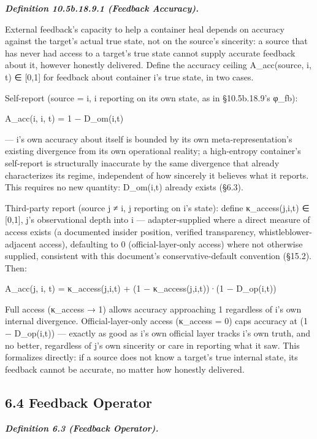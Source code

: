 \documentclass[
]{article}
\begin{document}
\emph{\textbf{Definition 10.5b.18.9.1 (Feedback Accuracy).}}

External feedback's capacity to help a container heal depends on
accuracy against the target's actual true state, not on the source's
sincerity: a source that has never had access to a target's true state
cannot supply accurate feedback about it, however honestly delivered.
Define the accuracy ceiling A\_acc(source, i, t) ∈ {[}0,1{]} for
feedback about container i's true state, in two cases.

Self-report (source = i, i reporting on its own state, as in
§10.5b.18.9's φ\_fb):

A\_acc(i, i, t) = 1 − D\_om(i,t)

--- i's own accuracy about itself is bounded by its own
meta-representation's existing divergence from its own operational
reality; a high-entropy container's self-report is structurally
inaccurate by the same divergence that already characterizes its regime,
independent of how sincerely it believes what it reports. This requires
no new quantity: D\_om(i,t) already exists (§6.3).

Third-party report (source j ≠ i, j reporting on i's state): define
κ\_access(j,i,t) ∈ {[}0,1{]}, j's observational depth into i ---
adapter-supplied where a direct measure of access exists (a documented
insider position, verified transparency, whistleblower-adjacent access),
defaulting to 0 (official-layer-only access) where not otherwise
supplied, consistent with this document's conservative-default
convention (§15.2). Then:

A\_acc(j, i, t) = κ\_access(j,i,t) + (1 − κ\_access(j,i,t))·(1 −
D\_op(i,t))

Full access (κ\_access → 1) allows accuracy approaching 1 regardless of
i's own internal divergence. Official-layer-only access (κ\_access = 0)
caps accuracy at (1 − D\_op(i,t)) --- exactly as good as i's own
official layer tracks i's own truth, and no better, regardless of j's
own sincerity or care in reporting what it saw. This formalizes
directly: if a source does not know a target's true internal state, its
feedback cannot be accurate, no matter how honestly delivered.

\hypertarget{feedback-operator}{%
\subsection{6.4 Feedback Operator}\label{feedback-operator}}

\emph{\textbf{Definition 6.3 (Feedback Operator).}}
\end{document}

